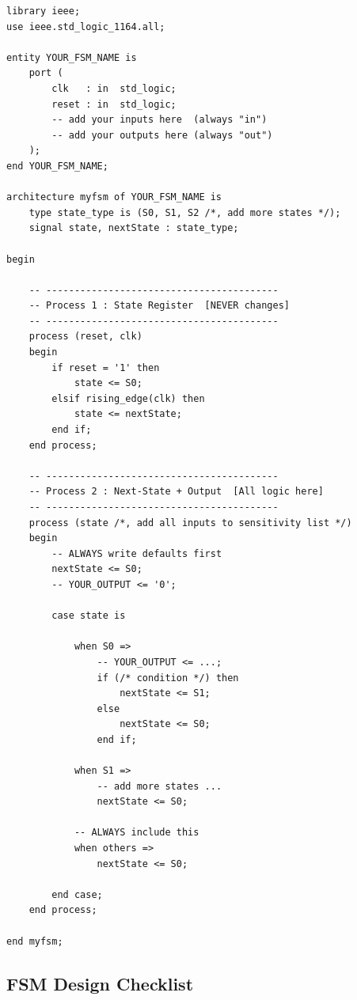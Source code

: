 \documentclass[12pt,a4paper]{article}
\begin{document}
\begin{tcolorbox}[vhdlbox, title={Master 2-Process FSM Template (Copy \& Adapt)}]
\begin{lstlisting}[style=vhdlstyle]
library ieee;
use ieee.std_logic_1164.all;

entity YOUR_FSM_NAME is
    port (
        clk   : in  std_logic;
        reset : in  std_logic;
        -- add your inputs here  (always "in")
        -- add your outputs here (always "out")
    );
end YOUR_FSM_NAME;

architecture myfsm of YOUR_FSM_NAME is
    type state_type is (S0, S1, S2 /*, add more states */);
    signal state, nextState : state_type;

begin

    -- -----------------------------------------
    -- Process 1 : State Register  [NEVER changes]
    -- -----------------------------------------
    process (reset, clk)
    begin
        if reset = '1' then
            state <= S0;
        elsif rising_edge(clk) then
            state <= nextState;
        end if;
    end process;

    -- -----------------------------------------
    -- Process 2 : Next-State + Output  [All logic here]
    -- -----------------------------------------
    process (state /*, add all inputs to sensitivity list */)
    begin
        -- ALWAYS write defaults first
        nextState <= S0;
        -- YOUR_OUTPUT <= '0';

        case state is

            when S0 =>
                -- YOUR_OUTPUT <= ...;
                if (/* condition */) then
                    nextState <= S1;
                else
                    nextState <= S0;
                end if;

            when S1 =>
                -- add more states ...
                nextState <= S0;

            -- ALWAYS include this
            when others =>
                nextState <= S0;

        end case;
    end process;

end myfsm;
\end{lstlisting}
\end{tcolorbox}

\subsection{FSM Design Checklist}
\end{document}
